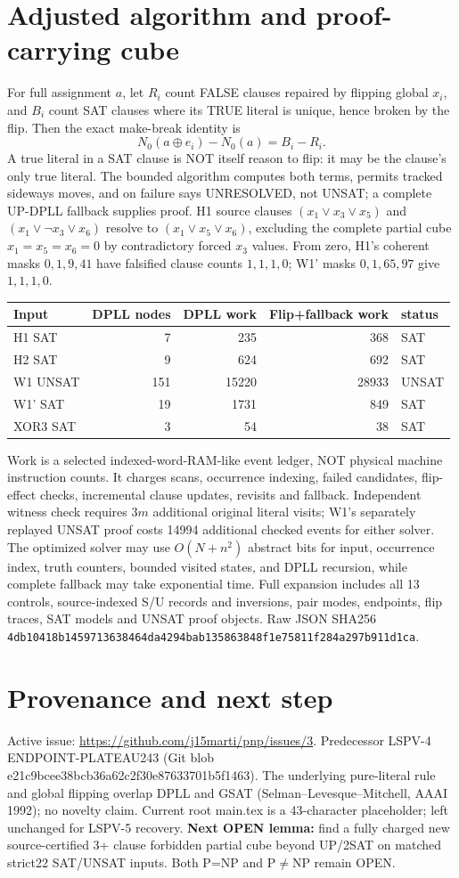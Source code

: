 \documentclass[10pt]{article}
\begin{document}
\section{Adjusted algorithm and proof-carrying cube}
For full assignment $a$, let $R_i$ count FALSE clauses repaired by flipping global $x_i$, and $B_i$ count SAT clauses where its TRUE literal is unique, hence broken by the flip. Then the exact make-break identity is
\[N_0(a\oplus e_i)-N_0(a)=B_i-R_i.\]
A true literal in a SAT clause is NOT itself reason to flip: it may be the clause's only true literal. The bounded algorithm computes both terms, permits tracked sideways moves, and on failure says UNRESOLVED, not UNSAT; a complete UP-DPLL fallback supplies proof. H1 source clauses $(x_1\vee x_3\vee x_5)$ and $(x_1\vee\neg x_3\vee x_6)$ resolve to $(x_1\vee x_5\vee x_6)$, excluding the complete partial cube $x_1=x_5=x_6=0$ by contradictory forced $x_3$ values. From zero, H1's coherent masks $0,1,9,41$ have falsified clause counts $1,1,1,0$; W1' masks $0,1,65,97$ give $1,1,1,0$.
\begin{center}\begin{tabular}{lrrrl}\toprule
Input&DPLL nodes&DPLL work&Flip+fallback work&status\\\midrule
H1 SAT&7&235&368&SAT\\
H2 SAT&9&624&692&SAT\\
W1 UNSAT&151&15220&28933&UNSAT\\
W1' SAT&19&1731&849&SAT\\
XOR3 SAT&3&54&38&SAT\\\bottomrule
\end{tabular}\end{center}
Work is a selected indexed-word-RAM-like event ledger, NOT physical machine instruction counts. It charges scans, occurrence indexing, failed candidates, flip-effect checks, incremental clause updates, revisits and fallback. Independent witness check requires $3m$ additional original literal visits; W1's separately replayed UNSAT proof costs 14994 additional checked events for either solver. The optimized solver may use $O(N+n^2)$ abstract bits for input, occurrence index, truth counters, bounded visited states, and DPLL recursion, while complete fallback may take exponential time. Full expansion includes all 13 controls, source-indexed S/U records and inversions, pair modes, endpoints, flip traces, SAT models and UNSAT proof objects. Raw JSON SHA256 \texttt{4db10418b1459713638464da4294bab135863848f1e75811f284a297b911d1ca}.
\section{Provenance and next step}
Active issue: \url{https://github.com/j15marti/pnp/issues/3}. Predecessor LSPV-4 ENDPOINT-PLATEAU243 (Git blob e21c9bcee38bcb36a62c2f30e87633701b5f1463). The underlying pure-literal rule and global flipping overlap DPLL and GSAT (Selman--Levesque--Mitchell, AAAI 1992); no novelty claim. Current root main.tex is a 43-character placeholder; left unchanged for LSPV-5 recovery. \textbf{Next OPEN lemma:} find a fully charged new source-certified 3+ clause forbidden partial cube beyond UP/2SAT on matched strict22 SAT/UNSAT inputs. Both P=NP and P$\ne$NP remain OPEN.
\end{document}
